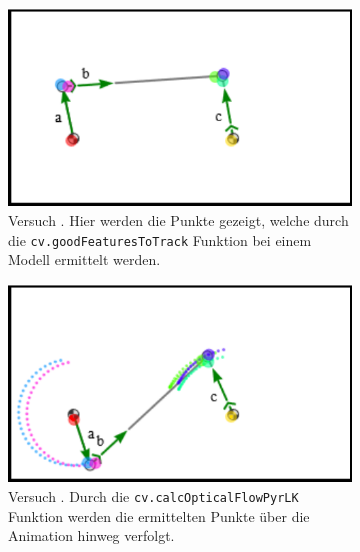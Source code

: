 \begin{figure}
    \centering
    \begin{subfigure}[t]{0.45\textwidth}
        \includegraphics[width=\textwidth]{gfx/lucas_kanade_simple.png}
        \caption{Versuch . Hier werden die Punkte gezeigt, welche durch die \lstinline{cv.goodFeaturesToTrack} Funktion bei einem  Modell ermittelt werden.}\label{fig:opticalflow2_1}
    \end{subfigure}
    \begin{subfigure}[t]{0.45\textwidth}
        \includegraphics[width=\textwidth]{gfx/lucas_kanade_history.png}
        \caption{Versuch . Durch die \lstinline{cv.calcOpticalFlowPyrLK} Funktion werden die ermittelten Punkte über die Animation hinweg verfolgt.}\label{fig:opticalflow2_2}
    \end{subfigure}
    \caption[Versuche  und ]{}
    \label{fig:opticalflow2_1_2}
\end{figure}

